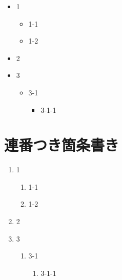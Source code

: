 \begin{itemize}
\item{} 1


\begin{itemize}
\item{} 1-1
\item{} 1-2
\end{itemize}
\item{} 2
\item{} 3


\begin{itemize}
\item{} 3-1


\begin{itemize}
\item{} 3-1-1
\end{itemize}
\end{itemize}
\end{itemize}

\section*{連番つき箇条書き}\hypertarget{連番つき箇条書き}{}\label{連番つき箇条書き}

\begin{enumerate}
\item{} 1


\begin{enumerate}
\item{} 1-1
\item{} 1-2
\end{enumerate}
\item{} 2
\item{} 3


\begin{enumerate}
\item{} 3-1


\begin{enumerate}
\item{} 3-1-1
\end{enumerate}
\end{enumerate}
\end{enumerate}

